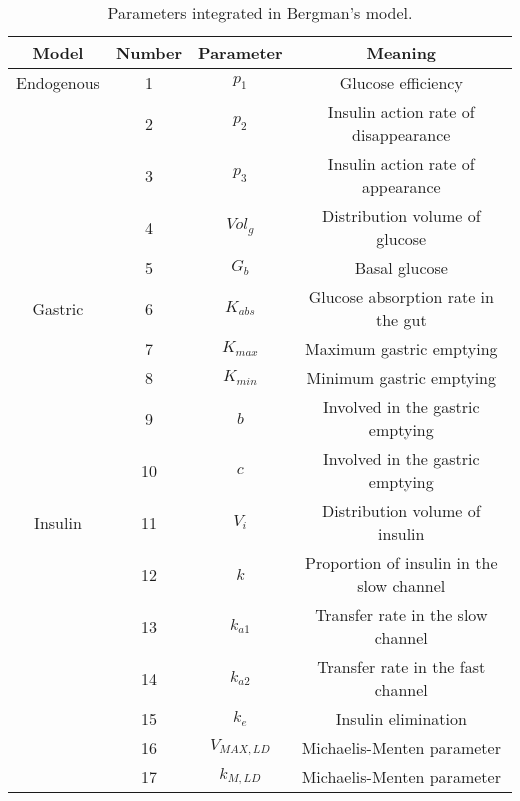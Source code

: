 
\begin{table}[hbtp]
	\centering
	\begin{tabular}{| c | c | c | c |}
	\hline 
	Model	& Number & Parameter & Meaning \\
	\hline 
	Endogenous & 1 & $p_{1}$ & Glucose efficiency \\
	 & 2 & $p_{2}$ & Insulin action rate of disappearance\\
	 & 3 & $p_{3}$ & Insulin action rate of appearance \\
	 & 4 & $Vol_{g}$ & Distribution volume of glucose \\
	 & 5 & $G_{b}$ & Basal glucose \\
	\hline
	Gastric & 6 & $K_{abs}$ & Glucose absorption rate in the gut \\
	 & 7 & $K_{max}$ & Maximum gastric emptying \\
	 & 8 & $K_{min}$ & Minimum gastric emptying \\
	 & 9 & $b$ & Involved in the gastric emptying \\
	 & 10 & $c$ & Involved in the gastric emptying \\
	\hline
	Insulin & 11 & $V_{i}$ & Distribution volume of insulin \\
	 & 12 & $k$ & Proportion of insulin in the slow channel\\
	 & 13 & $k_{a1}$ & Transfer rate in the slow channel \\
	 & 14 & $k_{a2}$ & Transfer rate in the fast channel \\
	 & 15 & $k_{e}$ & Insulin elimination \\
	 & 16 & $V_{MAX,LD}$ & Michaelis-Menten parameter \\
	 & 17 & $k_{M,LD}$ & Michaelis-Menten parameter \\
	\hline
	\end{tabular}
\caption{Parameters integrated in Bergman's model.}
\label{tab:bergmanparameters}
\end{table}

